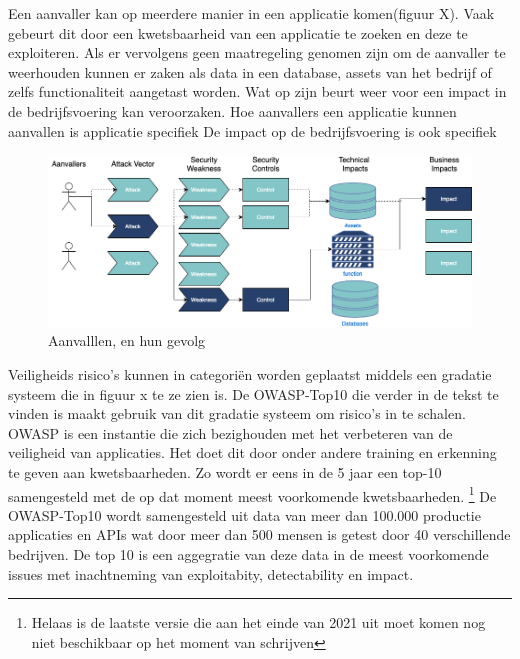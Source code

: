 Een aanvaller kan op meerdere manier in een applicatie komen(figuur X).
Vaak gebeurt dit door een kwetsbaarheid van een applicatie te zoeken en deze te exploiteren.
Als er vervolgens geen maatregeling genomen zijn om de aanvaller te weerhouden kunnen er zaken als data in een database, assets van het bedrijf of zelfs functionaliteit aangetast worden.
Wat op zijn beurt weer voor een impact in de bedrijfsvoering kan veroorzaken.
Hoe aanvallers een applicatie kunnen aanvallen is applicatie specifiek
De impact op de bedrijfsvoering is ook specifiek
\begin{figure}[H]
  \myfloatalign
  \includegraphics[width=15cm]{gfx/application security routes}
  \caption{Aanvalllen, en hun gevolg}
  \label{fig:Application Security Routes}
\end{figure}

Veiligheids risico's kunnen in categoriën worden geplaatst middels een gradatie systeem die in figuur x te ze zien is.
De OWASP-Top10 die verder in de tekst te vinden is maakt gebruik van dit gradatie systeem om risico's in te schalen.
OWASP is een instantie die zich bezighouden met het verbeteren van de veiligheid van applicaties.
Het doet dit door onder andere training en erkenning te geven aan kwetsbaarheden.
Zo wordt er eens in de 5 jaar een top-10 samengesteld met de op dat moment meest voorkomende kwetsbaarheden.
\footnote{Helaas is de laatste versie die aan het einde van 2021 uit moet komen nog niet beschikbaar op het moment van schrijven}
De OWASP-Top10 wordt samengesteld uit data van meer dan 100.000 productie applicaties en APIs wat door meer dan 500 mensen is getest door 40 verschillende bedrijven.
De top 10 is een aggegratie van deze data in de meest voorkomende issues met inachtneming van exploitabity, detectability en impact.



